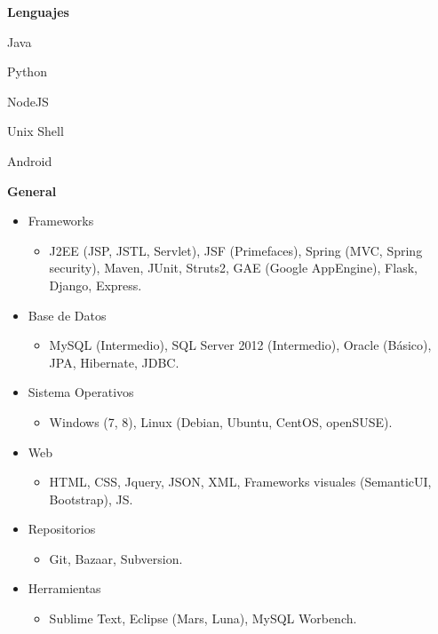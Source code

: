 \documentclass[a4paper,12pt,final]{memoir}
\newcommand{\SmallSep}{\vspace{0.5em}}
\newcommand{\CVSection}[1]
	{\Large\textbf{#1}\par
	\SmallSep\normalsize\normalfont}
\newcommand{\CVItem}[1]
	{\textbf{\color{RoyalBlue} #1}}
\begin{document}
\CVSection{Lenguajes}
\begin{multicols}{3}
\begin{compactitem}[\color{RoyalBlue}$\circ$]
	\item Java
	\item Python
	\item NodeJS
	\item Unix Shell
	\item Android
\end{compactitem}
\end{multicols}
\SmallSep

\CVItem{General}{
\begin{itemize}[noitemsep]
  \item Frameworks
  \begin{itemize}
    \item J2EE (JSP, JSTL, Servlet),
          JSF (Primefaces),
          Spring (MVC, Spring security),
          Maven, JUnit, Struts2, GAE (Google AppEngine),
          Flask, Django, Express.
  \end{itemize}
  \item Base de Datos
  \begin{itemize}
    \item MySQL (Intermedio), SQL Server 2012 (Intermedio), Oracle (Básico), JPA, Hibernate, JDBC.
  \end{itemize}
  \item Sistema Operativos
  \begin{itemize}
    \item Windows (7, 8), Linux (Debian, Ubuntu, CentOS, openSUSE).
  \end{itemize}
  \item Web
  \begin{itemize}
    \item HTML, CSS, Jquery, JSON, XML, Frameworks visuales (SemanticUI, Bootstrap), JS.
  \end{itemize}
  \item Repositorios
  \begin{itemize}
    \item Git, Bazaar, Subversion.
  \end{itemize}
  \item Herramientas
  \begin{itemize}
    \item Sublime Text, Eclipse (Mars, Luna), MySQL Worbench.
  \end{itemize}
\end{itemize}
}
\end{document}
